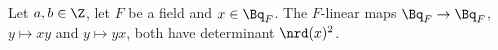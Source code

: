Let $a,b\in\Z$, let $F$ be a field and $x\in\Bq_F$. The $F$-linear maps $\Bq_F\to\Bq_F$, $y\mapsto xy$ and $y\mapsto yx$, both have
determinant $\nrd(x)^2$.
